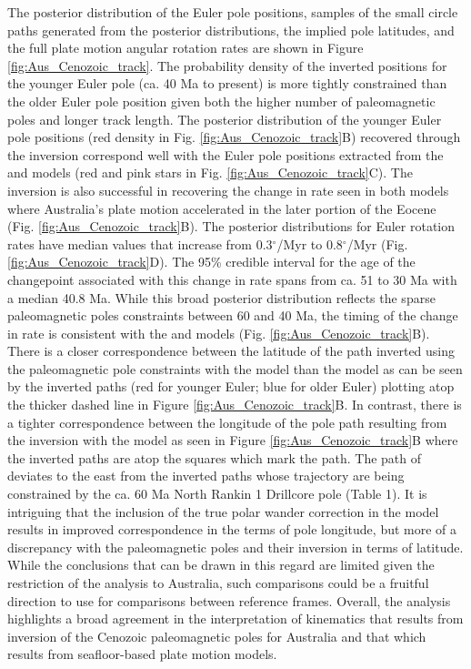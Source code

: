 \documentclass[11pt,letterpaper]{article}
\begin{document}
The posterior distribution of the Euler pole positions, samples of the small circle paths generated from the posterior distributions, the implied pole latitudes, and the full plate motion angular rotation rates are shown in Figure \ref{fig:Aus_Cenozoic_track}. The probability density of the inverted positions for the younger Euler pole (ca. 40 Ma to present) is more tightly constrained than the older Euler pole position given both the higher number of paleomagnetic poles and longer track length. The posterior distribution of the younger Euler pole positions (red density in Fig. \ref{fig:Aus_Cenozoic_track}B) recovered through the inversion correspond well with the Euler pole positions extracted from the \cite{Muller2016a} and \cite{Torsvik2017a} models (red and pink stars in Fig. \ref{fig:Aus_Cenozoic_track}C). The inversion is also successful in recovering the change in rate seen in both models where Australia's plate motion accelerated in the later portion of the Eocene (Fig. \ref{fig:Aus_Cenozoic_track}B). The posterior distributions for Euler rotation rates have median values that increase from 0.3$^\circ$/Myr to 0.8$^\circ$/Myr (Fig. \ref{fig:Aus_Cenozoic_track}D). The 95\% credible interval for the age of the changepoint associated with this change in rate spans from ca. 51 to 30 Ma with a median 40.8 Ma. While this broad posterior distribution reflects the sparse paleomagnetic poles constraints between 60 and 40 Ma, the timing of the change in rate is consistent with the \cite{Muller2016a} and \cite{Torsvik2017a} models (Fig. \ref{fig:Aus_Cenozoic_track}B). There is a closer correspondence between the latitude of the path inverted using the paleomagnetic pole constraints with the \cite{Muller2016a} model than the \cite{Torsvik2017a} model as can be seen by the inverted paths (red for younger Euler; blue for older Euler) plotting atop the thicker dashed line in Figure \ref{fig:Aus_Cenozoic_track}B. In contrast, there is a tighter correspondence between the longitude of the pole path resulting from the inversion with the \cite{Torsvik2017a} model as seen in Figure \ref{fig:Aus_Cenozoic_track}B where the inverted paths are atop the squares which mark the \cite{Torsvik2017a} path. The path of \cite{Muller2016a} deviates to the east from the inverted paths whose trajectory are being constrained by the ca. 60 Ma North Rankin 1 Drillcore pole (Table 1). It is intriguing that the inclusion of the \cite{Doubrovine2012a} true polar wander correction in the \cite{Torsvik2017a} model results in improved correspondence in the terms of pole longitude, but more of a discrepancy with the paleomagnetic poles and their inversion in terms of latitude. While the conclusions that can be drawn in this regard are limited given the restriction of the analysis to Australia, such comparisons could be a fruitful direction to use for comparisons between reference frames. Overall, the analysis highlights a broad agreement in the interpretation of kinematics that results from inversion of the Cenozoic paleomagnetic poles for Australia and that which results from seafloor-based plate motion models.
\end{document}
